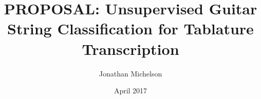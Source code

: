 \documentclass[12pt]{cmuthesis}
\begin{document}
 
\frontmatter

\pagestyle{empty}

\title{ %
{\bf PROPOSAL: Unsupervised Guitar String Classification for Tablature Transcription}}
\author{Jonathan Michelson}
\date{April 2017}
\trnumber{}


\support{}
\disclaimer{}



\maketitle


\pagestyle{plain} %







\mainmatter
\end{document}
